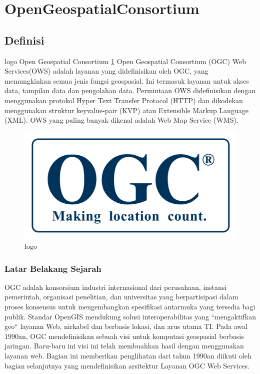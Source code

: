 
\section{OpenGeospatialConsortium}

\subsection{Definisi}

logo Open Geospatial Consortium \ref{ogc} Open Geospatial Consortium (OGC) Web Services(OWS) adalah layanan yang didefinisikan oleh OGC, yang memungkinkan semua jenis fungsi geospasial. Ini termasuk layanan untuk akses data, tampilan data dan pengolahan data. Permintaan OWS didefinisikan dengan menggunakan protokol Hyper Text Transfer Protocol (HTTP) dan dikodekan menggunakan struktur keyvalue-pair (KVP) atau Extensible Markup Language (XML). OWS yang paling banyak dikenal adalah Web Map Service (WMS). \cite{lupp2008open} 

\begin{figure}[ht]
	\centerline{\includegraphics[width=1\textwidth]{figures/ogc.png}}
	\caption{logo}
	\label{ogc}
	\end{figure}

\subsubsection{Latar Belakang Sejarah}

OGC adalah konsorsium industri internasional dari perusahaan, instansi pemerintah, organisasi penelitian, dan universitas yang berpartisipasi dalam proses konsensus untuk mengembangkan spesifikasi antarmuka yang tersedia bagi publik. Standar OpenGIS mendukung solusi interoperabilitas yang ``mengaktifkan geo`` layanan Web, nirkabel dan berbasis lokasi, dan arus utama TI. Pada awal 1990an, OGC mendefinisikan sebuah visi untuk komputasi geospasial berbasis jaringan. Baru-baru ini visi ini telah membuahkan hasil dengan menggunakan layanan web. Bagian ini memberikan penglihatan dari tahun 1990an diikuti oleh bagian selanjutnya yang mendefinisikan arsitektur Layanan OGC Web Services. 

